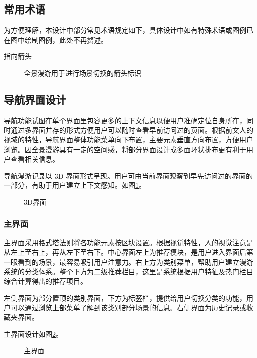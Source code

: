 \subsection{常用术语}
为方便理解，本设计中部分常见术语规定如下，具体设计中如有特殊术语或图例已在图中绘制图例，此处不再赘述。

\begin{description}
  \item [指向箭头] 全景漫游用于进行场景切换的箭头标识
\end{description}

\subsection{导航界面设计}
导航功能试图在单个界面里包容更多的上下文信息以便用户准确定位自身所在，同时通过多界面并存的形式方便用户可以随时查看早前访问过的页面。根据前文人的视域的特性，导航界面整体功能菜单向下布置，主要元素垂直方向布置，方便用户浏览。因全景漫游具有一定的空间感，将部分界面设计成多面环状排布更有利于用户查看相关信息。

导航漫游记录以 3D 界面形式呈现。用户可由当前界面观察到早先访问过的界面的一部分，有助于用户建立上下文感知。如图\ref{fig:d-03}。

\begin{figure}[htp]
\centering
{}
\caption{3D界面}
\label{fig:d-03}
\end{figure}

\subsubsection{主界面}
主界面采用格式塔法则将各功能元素按区块设置。根据视觉特性，人的视觉注意是从左上至右上，再从左下至右下。中心界面左上为推荐模块，是用户进入界面后第一眼看到的场景，最容易吸引用户注意力。右上方为类别菜单，帮助用户建立漫游系统的分类体系。整个下方为二级推荐栏目，这里是系统根据用户特征及热门栏目综合计算得出的推荐项目。

左侧界面为部分置顶的类别界面，下方为标签栏，提供给用户切换分类的功能，用户可以通过浏览上部菜单了解到该类别部分场景的信息。右侧界面为历史记录或收藏夹界面。

主界面设计如图\ref{fig:d-01}。

\begin{figure}[htp]
\centering
{}
\caption{主界面}
\label{fig:d-01}
\end{figure}

